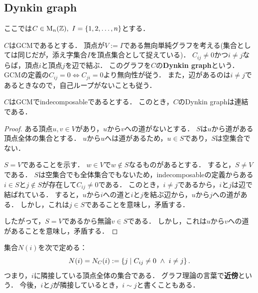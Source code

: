 \subsection{Dynkin graph}

ここでは$C \in \operatorname{M}_n(\mathbb{Z}),\ I = \{1, 2, \ldots, n\}$とする．

\begin{definition}
  \label{def:dynkinGraph}
  \leanok
  $C$はGCMであるとする．
  頂点が$V := I$である無向単純グラフを考える(集合としては同じだが，添え字集合$I$を頂点集合として捉えている)．
  $C_{ij} \ne 0$かつ$i \ne j$ならば，頂点$i$と頂点$j$を辺で結ぶ．
  このグラフを$C$の\textbf{Dynkin graph}という．
  GCMの定義の$C_{ij} = 0 \iff C_{ji} = 0$より無向性が従う．
  また，辺があるのは$i \ne j$であるときなので，自己ループがないことも従う．
\end{definition}

\begin{lemma}
  \label{lem:dynkinGraph_preconnected}
  \leanok
  \uses{}
  $C$はGCMでindecomposableであるとする．
  このとき，$C$のDynkin graphは連結である．
\end{lemma}

\begin{proof}
  ある頂点$u, v \in V$があり，$u$から$v$への道がないとする．
  $S$は$u$から道がある頂点全体の集合とする．
  $u$から$u$へは道があるため，$u \in S$であり，$S$は空集合でない．
  
  $S = V$であることを示す．
  $w \in V$で$w \notin S$なるものがあるとする．
  すると，$S \ne V$である．
  $S$は空集合でも全体集合でもないため，indecomposableの定義からある$i \in S$と$j \notin S$が存在して$C_{ij} \ne 0$である．
  このとき，$i \ne j$であるから，$i$と$j$は辺で結ばれている．
  すると，$u$から$i$への道と$i$と$j$を結ぶ辺から，$u$から$j$への道がある．
  しかし，これは$j \in S$であることを意味し，矛盾する．

  したがって，$S = V$であるから無論$v \in S$である．
  しかし，これは$u$から$v$への道があることを意味し，矛盾する．
\end{proof}

\begin{definition}
  \label{def:neighborSet}
  \leanok
  集合$N(i)$を次で定める：
  \begin{equation}
    N(i) = N_C(i) := \set{j}{C_{ij} \ne 0\ \land\ i \ne j}.
  \end{equation}
  つまり，$i$に隣接している頂点全体の集合である．
  グラフ理論の言葉で\textbf{近傍}という．
  今後，$i$と$j$が隣接しているとき，$i \sim j$と書くこともある．
\end{definition}

